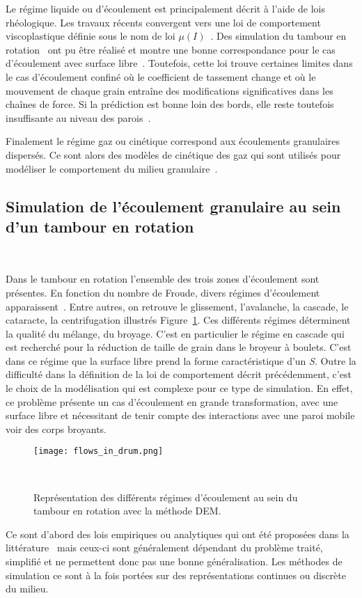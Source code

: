 Le régime liquide ou d'écoulement est principalement décrit à l'aide de lois rhéologique. Les travaux récents convergent vers une loi de comportement viscoplastique définie sous le nom de loi $\mu(I)$~\cite{gdr_midi_dense_2004,jop_constitutive_2006}. Des simulation du tambour en rotation~\cite{Cortet_2009} ont pu être réalisé et montre une bonne correspondance pour le cas d'écoulement avec surface libre~\cite{chou_cross-sectional_2009}. Toutefois, cette loi trouve certaines limites dans le cas d'écoulement confiné où le coefficient de tassement change et où le mouvement de chaque grain entraîne des modifications significatives dans les chaînes de force. Si la prédiction est bonne loin des bords, elle reste toutefois insuffisante au niveau des parois~\cite{Rognon_Miller_Metzger_Einav_2015}.

Finalement le régime gaz ou cinétique correspond aux écoulements granulaires dispersés. Ce sont alors des modèles de cinétique des gaz qui sont utilisés pour modéliser le comportement du milieu granulaire~\cite{Ng2008}.

\subsection*{Simulation de l'écoulement granulaire au sein d'un tambour en rotation}~\label{sec:methode_resolution}

Dans le tambour en rotation l'ensemble des trois zones d'écoulement sont présentes. En fonction du nombre de Froude, divers régimes d'écoulement apparaissent~\cite{MELLMANN2001251}. Entre autres, on retrouve le glissement, l'avalanche, la cascade, le cataracte, la centrifugation illustrés Figure~\ref{fig:flow_drum}. Ces différents régimes déterminent la qualité du mélange, du broyage. C'est en particulier le régime en cascade qui est recherché pour la réduction de taille de grain dans le broyeur à boulets. C'est dans ce régime que la surface libre prend la forme caractéristique d'un \textit{S}. Outre la difficulté dans la définition de la loi de comportement décrit précédemment, c'est le choix de la modélisation qui est complexe pour ce type de simulation. En effet, ce problème présente un cas d'écoulement en grande transformation, avec une surface libre et nécessitant de tenir compte des interactions avec une paroi mobile voir des corps broyants.

\begin{figure}[h]
    \centering
    \texttt{[image: flows\_in\_drum.png]}
    \caption{Représentation des différents régimes d'écoulement au sein du tambour en rotation avec la méthode DEM.}~\label{fig:flow_drum}
\end{figure}
Ce sont d'abord des lois empiriques ou analytiques qui ont été proposées dans la littérature~\cite{Ding2001,Boateng1998,Nicholas2001} mais ceux-ci sont généralement dépendant du problème traité, simplifié et ne permettent donc pas une bonne généralisation. Les méthodes de simulation ce sont à la fois portées sur des représentations continues ou discrète du milieu.

